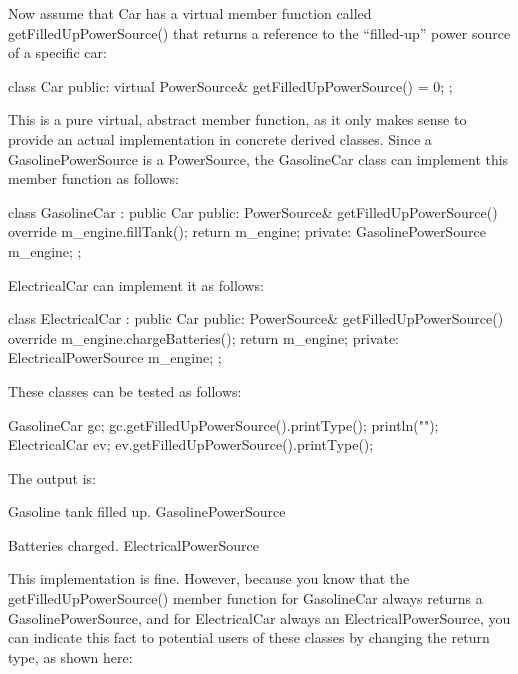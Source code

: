 Now assume that Car has a virtual member function called getFilledUpPowerSource() that returns a reference to the “filled-up” power source of a specific car:

\begin{cpp}
class Car
{
    public:
        virtual PowerSource& getFilledUpPowerSource() = 0;
};
\end{cpp}

This is a pure virtual, abstract member function, as it only makes sense to provide an actual implementation in concrete derived classes. Since a GasolinePowerSource is a PowerSource, the GasolineCar class can implement this member function as follows:

\begin{cpp}
class GasolineCar : public Car
{
    public:
        PowerSource& getFilledUpPowerSource() override
        {
            m_engine.fillTank();
            return m_engine;
        }
    private:
        GasolinePowerSource m_engine;
};
\end{cpp}

ElectricalCar can implement it as follows:

\begin{cpp}
class ElectricalCar : public Car
{
    public:
        PowerSource& getFilledUpPowerSource() override
        {
            m_engine.chargeBatteries();
            return m_engine;
        }
    private:
        ElectricalPowerSource m_engine;
};
\end{cpp}

These classes can be tested as follows:

\begin{cpp}
GasolineCar gc;
gc.getFilledUpPowerSource().printType();
println("");
ElectricalCar ev;
ev.getFilledUpPowerSource().printType();
\end{cpp}

The output is:

\begin{shell}
Gasoline tank filled up.
GasolinePowerSource

Batteries charged.
ElectricalPowerSource
\end{shell}

This implementation is fine. However, because you know that the getFilledUpPowerSource() member function for GasolineCar always returns a GasolinePowerSource, and for ElectricalCar always an ElectricalPowerSource, you can indicate this fact to potential users of these classes by changing the return type, as shown here:

